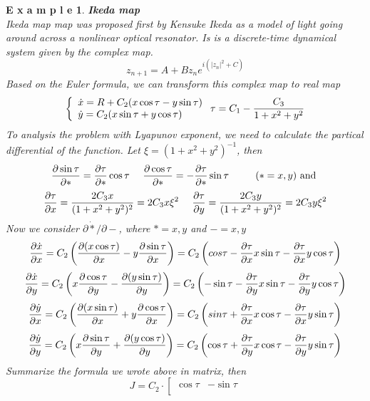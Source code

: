 \documentclass[12pt]{article}
\theoremstyle{plain}
\newtheorem{example}{\textbf{E x a m p l e}}[section]
\begin{document}
\begin{example}\textbf{Ikeda map}
\\\noindent Ikeda map map was proposed first by Kensuke Ikeda as a model of light going around across a nonlinear optical resonator. Is is a discrete-time dynamical system given by the complex map.
$$
z_{{n+1}}=A+Bz_{n}e^{{i(|z_{n}|^{2}+C)}}
$$ 
Based on the Euler formula, we can transform this complex map to real map
$$
\left\{\begin{array}{l}
\dot x = R + C_2(x \cos \tau - y \sin \tau) \\
\dot y = C_2(x \sin \tau + y \cos \tau)
\end{array}\right. \tau = C_1 - {C_3 \over 1 + x^2 + y^2}
$$
To analysis the problem with Lyapunov exponent, we need to calculate the partical differential of the function. Let $\xi =  (1 + x^2 + y^2)^{-1}$, then
$$
{\partial \sin \tau \over \partial *} = {\partial \tau \over \partial *}\cos \tau \ \ \ \
{\partial \cos \tau \over \partial *} = -{\partial \tau \over \partial *}\sin \tau \ \ \ \ \ \ \ \ 
(* = x, y) \text{ and }
$$
$$
{\partial\tau \over \partial x} = {2C_3x \over (1 + x^2 + y^2)^2} = 2C_3x \xi^2 \ \ \ \ 
{\partial\tau \over \partial y} = {2C_3y \over (1 + x^2 + y^2)^2} = 2C_3y \xi^2
$$
Now we consider $\partial\dot * /\partial -$, where $*= x,y$ and $- = x,y$
$$
{\partial \dot x \over \partial x} 
= C_2\left({\partial(x\cos\tau)\over\partial x} - y {\partial \sin\tau \over \partial x}\right) 
= C_2\left(cos \tau - {{\partial \tau \over \partial x}x\sin \tau} - {\partial \tau \over \partial x} y \cos \tau\right) 
$$
$$
{\partial \dot x \over \partial y} 
= C_2\left(x{\partial\cos\tau\over\partial y} - {\partial (y \sin\tau) \over \partial y}\right) 
= C_2\left(-\sin \tau - {{\partial \tau \over \partial y}x\sin \tau} - {\partial \tau \over \partial y} y \cos \tau\right) 
$$
$$
{\partial \dot y \over \partial x} 
= C_2\left({\partial(x\sin\tau)\over\partial x} + y {\partial \cos\tau \over \partial x}\right) 
= C_2\left(sin \tau + {{\partial \tau \over \partial x}x\cos \tau} - {\partial \tau \over \partial x} y \sin \tau\right) 
$$
$$
{\partial \dot y \over \partial y} 
= C_2\left(x{\partial\sin\tau\over\partial y} + {\partial (y \cos\tau) \over \partial y}\right) 
= C_2\left(\cos \tau + {{\partial \tau \over \partial y}x\cos \tau} - {\partial \tau \over \partial y} y \sin \tau\right) 
$$
Summarize the formula we wrote above in matrix, then
$$
J = C_2 \cdot
\left[\begin{array}{cc}
    \cos \tau & -\sin \tau \\

\end{array}$$
\end{example}
\end{document}
